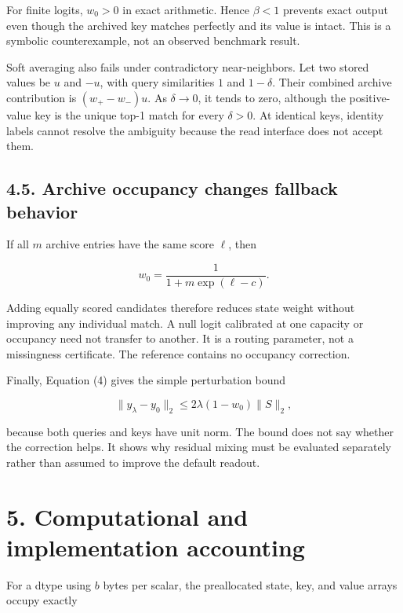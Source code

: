 \documentclass[11pt,a4paper]{article}
\begin{document}
For finite logits, \(w_0>0\) in exact arithmetic. Hence \(\beta<1\) prevents exact output even though the archived key matches perfectly and its value is intact. This is a symbolic counterexample, not an observed benchmark result.

Soft averaging also fails under contradictory near-neighbors. Let two stored values be \(u\) and \(-u\), with query similarities \(1\) and \(1-\delta\). Their combined archive contribution is \((w_+-w_-)u\). As \(\delta\to0\), it tends to zero, although the positive-value key is the unique top-1 match for every \(\delta>0\). At identical keys, identity labels cannot resolve the ambiguity because the read interface does not accept them.

\subsection{4.5. Archive occupancy changes fallback behavior}\label{archive-occupancy-changes-fallback-behavior}

If all \(m\) archive entries have the same score \(\ell\), then

\nopagebreak[4]

\[
w_0=\frac{1}{1+m\exp(\ell-c)}. \tag{12}
\]

Adding equally scored candidates therefore reduces state weight without improving any individual match. A null logit calibrated at one capacity or occupancy need not transfer to another. It is a routing parameter, not a missingness certificate. The reference contains no occupancy correction.

Finally, Equation (4) gives the simple perturbation bound

\nopagebreak[4]

\[
\|y_{\lambda}-y_0\|_2\leq
2\lambda(1-w_0)\|S\|_2, \tag{13}
\]

because both queries and keys have unit norm. The bound does not say whether the correction helps. It shows why residual mixing must be evaluated separately rather than assumed to improve the default readout.

\section{5. Computational and implementation accounting}\label{computational-and-implementation-accounting}

For a dtype using \(b\) bytes per scalar, the preallocated state, key, and value arrays occupy exactly
\end{document}
